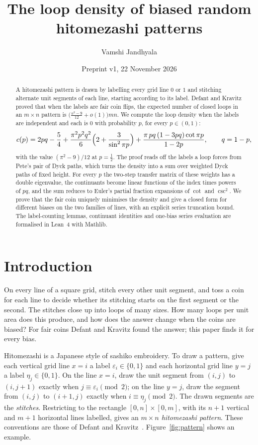 \documentclass[11pt]{amsart}
\title{The loop density of biased random hitomezashi patterns}
\author{Vamshi Jandhyala}
\date{Preprint v1, 22 November 2026}
\theoremstyle{definition}
\theoremstyle{remark}
\begin{document}
\begin{abstract}
A hitomezashi pattern is drawn by labelling every grid line $0$ or $1$ and stitching alternate unit
segments of each line, starting according to its label. Defant and Kravitz proved that when the labels
are fair coin flips, the expected number of closed loops in an $m\times n$ pattern is
$\bigl(\tfrac{\pi^2-9}{12}+o(1)\bigr)mn$. We compute the loop density when the labels are independent
and each is $0$ with probability $p$, for every $p\in(0,1)$:
\[
c(p)=2pq-\frac54+\frac{\pi^2p^2q^2}{6}\Bigl(2+\frac{3}{\sin^2\pi p}\Bigr)+\frac{\pi\,pq\,(1-3pq)\cot\pi p}{1-2p},
\qquad q=1-p,
\]
with the value $(\pi^2-9)/12$ at $p=\tfrac12$. The proof reads off the labels a loop forces from Pete's
pair of Dyck paths, which turns the density into a sum over weighted Dyck paths of fixed height. For
every $p$ the two-step transfer matrix of these weights has a double eigenvalue, the continuants
become linear functions of the index times powers of $pq$, and the sum reduces to Euler's partial fraction expansions
of $\cot$ and $\csc^2$. We prove that the fair coin uniquely minimises the density and give a
closed form for different biases on the two families of lines, with an explicit series truncation
bound. The label-counting lemmas, continuant identities and one-bias series evaluation are formalised
in Lean~4 with Mathlib.
\end{abstract}
\maketitle

\section{Introduction}

On every line of a square grid, stitch every other unit segment, and toss a coin for each line to decide whether
its stitching starts on the first segment or the second. The stitches close up into loops of many sizes. How many
loops per unit area does this produce, and how does the answer change when the coins are biased? For fair coins
Defant and Kravitz found the answer; this paper finds it for every bias.

Hitomezashi is a Japanese style of sashiko embroidery. To draw a pattern, give each vertical grid line
$x=i$ a label $\varepsilon_i\in\{0,1\}$ and each horizontal grid line $y=j$ a label $\eta_j\in\{0,1\}$.
On the line $x=i$, draw the unit segment from $(i,j)$ to $(i,j+1)$ exactly when $j\equiv\varepsilon_i
\pmod 2$; on the line $y=j$, draw the segment from $(i,j)$ to $(i+1,j)$ exactly when $i\equiv\eta_j
\pmod 2$. The drawn segments are the \emph{stitches}. Restricting to the rectangle $[0,n]\times[0,m]$,
with its $n+1$ vertical and $m+1$ horizontal lines labelled, gives an \emph{$m\times n$ hitomezashi
pattern}. These conventions are those of Defant and Kravitz~\cite{DK24}. Figure~\ref{fig:pattern} shows
an example.
\end{document}
